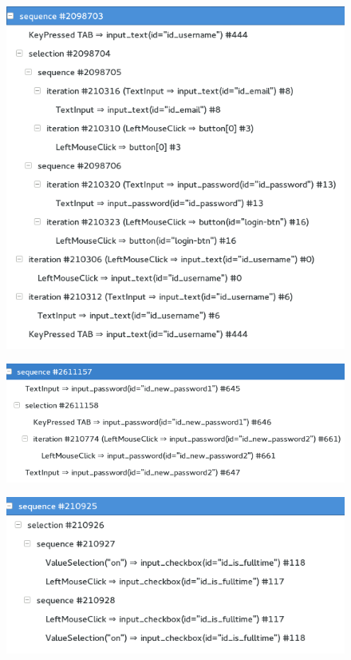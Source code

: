 \begin{figure}
	\centering
	\includegraphics[]{chapters/casestudy/mixedtasktree.png}
	\caption{}
	\label{}
\end{figure}
\begin{figure}
	\centering
	\includegraphics[]{chapters/casestudy/newpassword.png}
	\caption{}
	\label{}
\end{figure}
\begin{figure}
	\centering
	\includegraphics[]{chapters/casestudy/preprocessing_needed.png}
	\caption{}
	\label{}
\end{figure}
